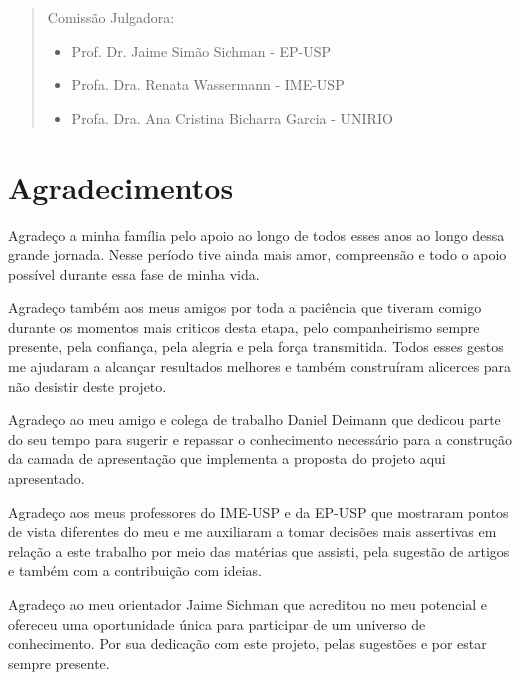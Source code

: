 \documentclass[11pt,twoside,a4paper]{book}
\begin{document}
    \begin{quote}
    \noindent Comissão Julgadora:
    
    \begin{itemize}
		\item Prof. Dr. Jaime Simão Sichman - EP-USP
		\item Profa. Dra. Renata Wassermann - IME-USP
		\item Profa. Dra. Ana Cristina Bicharra Garcia - UNIRIO
    \end{itemize}
      
    \end{quote}
\pagebreak



\chapter*{Agradecimentos}

Agradeço a minha família pelo apoio ao longo de todos esses anos ao longo dessa grande jornada. Nesse período tive ainda mais amor, compreensão e todo o apoio possível durante essa fase de minha vida. 

Agradeço também aos meus amigos por toda a paciência que tiveram comigo durante os momentos mais criticos desta etapa, pelo companheirismo sempre presente, pela confiança, pela alegria e pela força transmitida. Todos esses gestos me ajudaram a alcançar resultados melhores e também construíram alicerces para não desistir deste projeto. 

Agradeço ao meu amigo e colega de trabalho Daniel Deimann que dedicou parte do seu tempo para sugerir e repassar o conhecimento necessário para a construção da camada de apresentação que implementa a proposta do projeto aqui apresentado.

Agradeço aos meus professores do IME-USP e da EP-USP que mostraram pontos de vista diferentes do meu e me auxiliaram a tomar decisões mais assertivas em relação a este trabalho por meio das matérias que assisti, pela sugestão de artigos e também com a contribuição com ideias.

Agradeço ao meu orientador Jaime Sichman que acreditou no meu potencial e ofereceu uma oportunidade única para participar de um universo de conhecimento. Por sua dedicação com este projeto, pelas sugestões e por estar sempre presente.
\end{document}
